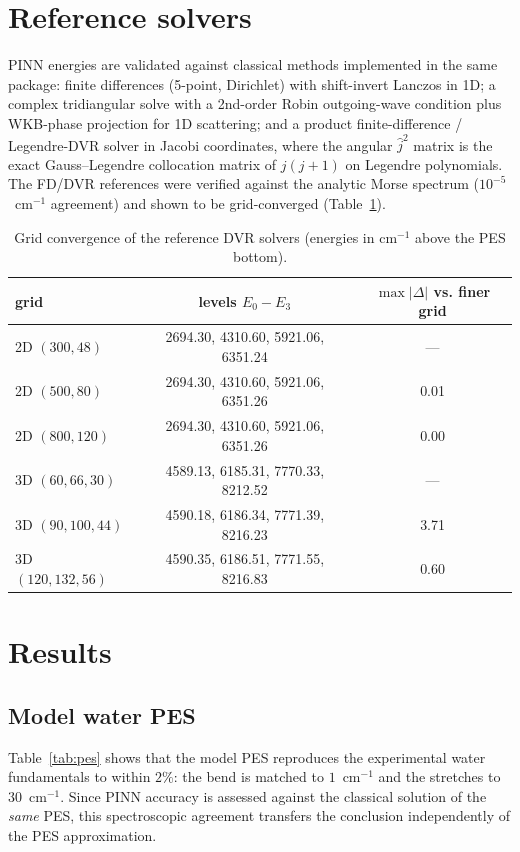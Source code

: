 \documentclass[11pt,a4paper]{article}
\newcommand{\cmi}{\ensuremath{\mathrm{cm}^{-1}}}
\begin{document}
\section{Reference solvers}

PINN energies are validated against classical methods implemented in the same
package: finite differences (5-point, Dirichlet) with shift-invert Lanczos in 1D;
a complex tridiangular solve with a 2nd-order Robin outgoing-wave condition plus
WKB-phase projection for 1D scattering; and a product finite-difference /
Legendre-DVR solver in Jacobi coordinates, where the angular $\hat j^2$ matrix
is the exact Gauss--Legendre collocation matrix of $j(j+1)$ on Legendre
polynomials. The FD/DVR references were verified against the analytic Morse
spectrum ($10^{-5}$~\cmi{} agreement) and shown to be grid-converged
(Table~\ref{tab:conv}).

\begin{table}[t]
\centering
\caption{Grid convergence of the reference DVR solvers (energies in cm$^{-1}$
above the PES bottom).}
\label{tab:conv}
\begin{tabular}{lcc}
\toprule
grid & levels $E_0-E_3$ & $\max|\Delta|$ vs. finer grid \\
\midrule
2D $(300,48)$ & 2694.30, 4310.60, 5921.06, 6351.24 & --- \\
2D $(500,80)$ & 2694.30, 4310.60, 5921.06, 6351.26 & 0.01 \\
2D $(800,120)$ & 2694.30, 4310.60, 5921.06, 6351.26 & 0.00 \\
\midrule
3D $(60,66,30)$ & 4589.13, 6185.31, 7770.33, 8212.52 & --- \\
3D $(90,100,44)$ & 4590.18, 6186.34, 7771.39, 8216.23 & 3.71 \\
3D $(120,132,56)$ & 4590.35, 6186.51, 7771.55, 8216.83 & 0.60 \\
\bottomrule
\end{tabular}
\end{table}

\section{Results}
\label{sec:results}

\subsection{Model water PES}

Table~\ref{tab:pes} shows that the model PES reproduces the experimental
water fundamentals to within $2\%$: the bend is matched to $1$~\cmi{} and
the stretches to $30$~\cmi{}. Since PINN accuracy is assessed against the
classical solution of the \emph{same} PES, this spectroscopic agreement
transfers the conclusion independently of the PES approximation.
\end{document}
